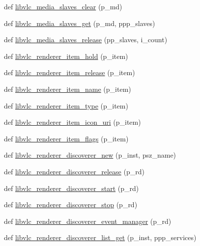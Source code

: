 \begin{DoxyCompactItemize}
\item 
def \hyperlink{namespacevlc_ad3b2622646a9b47d26c66d7ba9ba8759}{libvlc\+\_\+media\+\_\+slaves\+\_\+clear} (p\+\_\+md)
\item 
def \hyperlink{namespacevlc_a8e0842606e258c50d03baa1ecae992b3}{libvlc\+\_\+media\+\_\+slaves\+\_\+get} (p\+\_\+md, ppp\+\_\+slaves)
\item 
def \hyperlink{namespacevlc_a0f88998fe6f9a81c6d9d4476acfd9b36}{libvlc\+\_\+media\+\_\+slaves\+\_\+release} (pp\+\_\+slaves, i\+\_\+count)
\item 
def \hyperlink{namespacevlc_a18b5ce5a1f7fedb1834c9f80d444b08e}{libvlc\+\_\+renderer\+\_\+item\+\_\+hold} (p\+\_\+item)
\item 
def \hyperlink{namespacevlc_a5086523148dd38cc9d179a9cbf9e47b1}{libvlc\+\_\+renderer\+\_\+item\+\_\+release} (p\+\_\+item)
\item 
def \hyperlink{namespacevlc_af07b197185f16792044c2e60d04dc412}{libvlc\+\_\+renderer\+\_\+item\+\_\+name} (p\+\_\+item)
\item 
def \hyperlink{namespacevlc_ab762670fe5ec4fce2445ec301981eb59}{libvlc\+\_\+renderer\+\_\+item\+\_\+type} (p\+\_\+item)
\item 
def \hyperlink{namespacevlc_a52e4801a24e87686f2503e8314b0faf9}{libvlc\+\_\+renderer\+\_\+item\+\_\+icon\+\_\+uri} (p\+\_\+item)
\item 
def \hyperlink{namespacevlc_ad174676e7111c33c43ffdee9650725fd}{libvlc\+\_\+renderer\+\_\+item\+\_\+flags} (p\+\_\+item)
\item 
def \hyperlink{namespacevlc_a3f696d66405b9f0cf8d2c6932f763cfa}{libvlc\+\_\+renderer\+\_\+discoverer\+\_\+new} (p\+\_\+inst, psz\+\_\+name)
\item 
def \hyperlink{namespacevlc_a81262d81bc9835dc7bdaea45c9d20b06}{libvlc\+\_\+renderer\+\_\+discoverer\+\_\+release} (p\+\_\+rd)
\item 
def \hyperlink{namespacevlc_a0386aa768d1743a6462da7bd8266c7b6}{libvlc\+\_\+renderer\+\_\+discoverer\+\_\+start} (p\+\_\+rd)
\item 
def \hyperlink{namespacevlc_a2fab3a4810e94af669b4ac595dd32632}{libvlc\+\_\+renderer\+\_\+discoverer\+\_\+stop} (p\+\_\+rd)
\item 
def \hyperlink{namespacevlc_a1ea941d7c32dbab6a943838c3d2dda32}{libvlc\+\_\+renderer\+\_\+discoverer\+\_\+event\+\_\+manager} (p\+\_\+rd)
\item 
def \hyperlink{namespacevlc_af59f382bb827e83d0dfa826e209d12ef}{libvlc\+\_\+renderer\+\_\+discoverer\+\_\+list\+\_\+get} (p\+\_\+inst, ppp\+\_\+services)

\end{DoxyCompactItemize}
